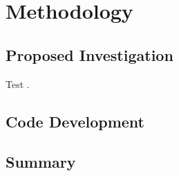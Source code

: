 \chapter{Methodology}

\ifpdf
    \graphicspath{{Chapter3/Figs/Raster/}{Chapter3/Figs/PDF/}{Chapter3/Figs/}}
\else
    \graphicspath{{Chapter3/Figs/Vector/}{Chapter3/Figs/}}
\fi

\section{Proposed Investigation}
Test \citet{reftest}.
\section{Code Development}
\section{Summary}

